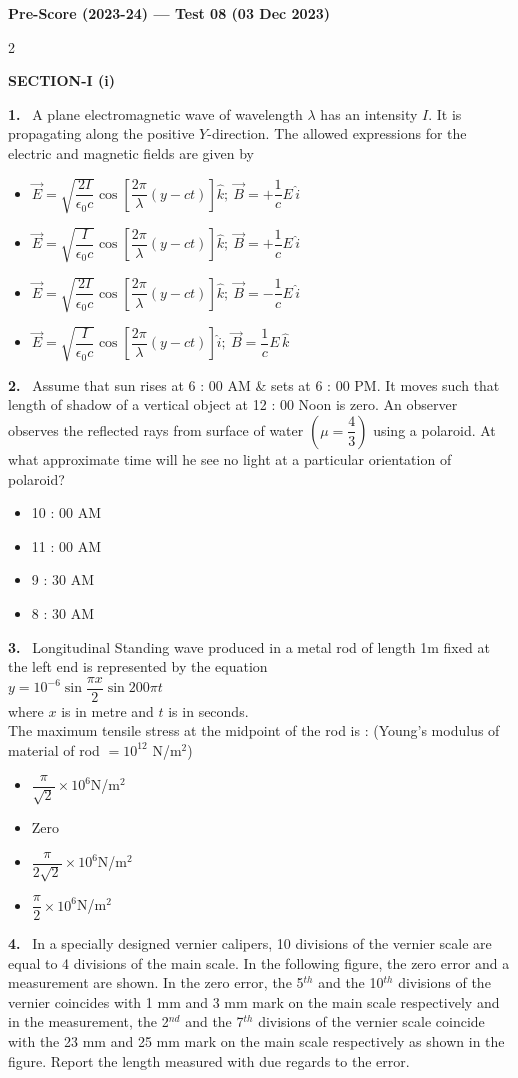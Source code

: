 \documentclass[10pt]{extarticle}
\newcommand{\papersec}[1]{\par\bigskip{\centering\Large\bfseries PAPER-#1\par}\medskip}
\newcommand{\partsec}[2]{\par\medskip\noindent{\large\bfseries PART-#1: #2}\par\smallskip}
\newcommand{\sect}[1]{\par\smallskip\noindent\textbf{#1}\par}
\newcommand{\qn}[1]{\par\smallskip\noindent\textbf{#1.}~}
\newenvironment{qoptions}{\begin{itemize}[leftmargin=1.8em,itemsep=1pt,topsep=2pt,label={}]}{\end{itemize}}
\newcommand{\opt}[2]{\item[(#1)] #2}
\begin{document}
\begin{center}{\Large\bfseries Pre-Score (2023-24) --- Test 08 (03 Dec 2023)}\end{center}
\begin{multicols}{2}
\papersec{1}
\partsec{1}{PHYSICS}
\sect{SECTION-I (i)}
\qn{1} A plane electromagnetic wave of wavelength $\lambda$ has an intensity $I$. It is propagating along the positive $Y$-direction. The allowed expressions for the electric and magnetic fields are given by
\begin{qoptions}
\opt{A}{$\vec E=\sqrt{\dfrac{2I}{\epsilon_0c}}\cos\!\left[\dfrac{2\pi}{\lambda}(y-ct)\right]\hat k;\ \vec B=+\dfrac1cE\,\hat i$}
\opt{B}{$\vec E=\sqrt{\dfrac{I}{\epsilon_0c}}\cos\!\left[\dfrac{2\pi}{\lambda}(y-ct)\right]\hat k;\ \vec B=+\dfrac1cE\,\hat i$}
\opt{C}{$\vec E=\sqrt{\dfrac{2I}{\epsilon_0c}}\cos\!\left[\dfrac{2\pi}{\lambda}(y-ct)\right]\hat k;\ \vec B=-\dfrac1cE\,\hat i$}
\opt{D}{$\vec E=\sqrt{\dfrac{I}{\epsilon_0c}}\cos\!\left[\dfrac{2\pi}{\lambda}(y-ct)\right]\hat i;\ \vec B=\dfrac1cE\,\hat k$}
\end{qoptions}
\qn{2} Assume that sun rises at 6 : 00 AM \& sets at 6 : 00 PM. It moves such that length of shadow of a vertical object at 12 : 00 Noon is zero. An observer observes the reflected rays from surface of water $\left(\mu=\dfrac43\right)$ using a polaroid. At what approximate time will he see no light at a particular orientation of polaroid?
\begin{qoptions}
\opt{A}{10 : 00 AM}
\opt{B}{11 : 00 AM}
\opt{C}{9 : 30 AM}
\opt{D}{8 : 30 AM}
\end{qoptions}
\qn{3} Longitudinal Standing wave produced in a metal rod of length 1m fixed at the left end is represented by the equation\\
$y=10^{-6}\sin\dfrac{\pi x}{2}\sin200\pi t$\\
where $x$ is in metre and $t$ is in seconds.\\
The maximum tensile stress at the midpoint of the rod is : (Young's modulus of material of rod $=10^{12}$ N/m$^2$)
\begin{qoptions}
\opt{A}{$\dfrac{\pi}{\sqrt2}\times10^6$N/m$^2$}
\opt{B}{Zero}
\opt{C}{$\dfrac{\pi}{2\sqrt2}\times10^6$N/m$^2$}
\opt{D}{$\dfrac\pi2\times10^6$N/m$^2$}
\end{qoptions}
\qn{4} In a specially designed vernier calipers, 10 divisions of the vernier scale are equal to 4 divisions of the main scale. In the following figure, the zero error and a measurement are shown. In the zero error, the 5$^{th}$ and the 10$^{th}$ divisions of the vernier coincides with 1 mm and 3 mm mark on the main scale respectively and in the measurement, the 2$^{nd}$ and the 7$^{th}$ divisions of the vernier scale coincide with the 23 mm and 25 mm mark on the main scale respectively as shown in the figure. Report the length measured with due regards to the error.

\end{multicols}
\end{document}
